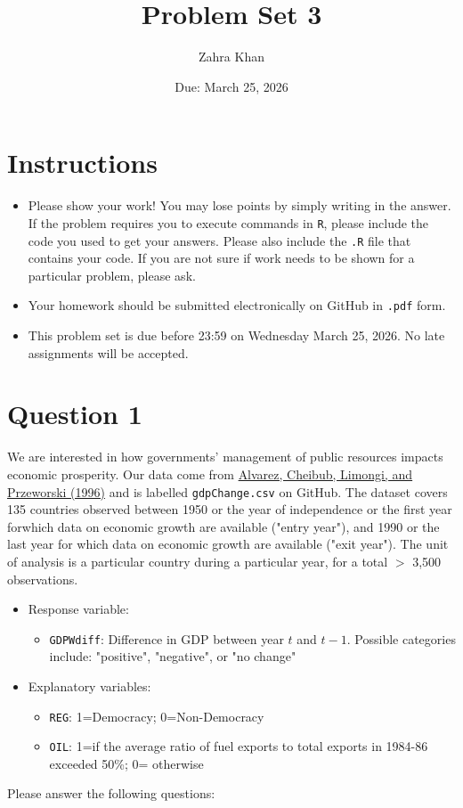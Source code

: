 \documentclass[12pt,letterpaper]{article}
\title{Problem Set 3}
\date{Due: March 25, 2026}
\author{Zahra Khan}
\begin{document}
	\maketitle
	\section*{Instructions}
	\begin{itemize}
	\item Please show your work! You may lose points by simply writing in the answer. If the problem requires you to execute commands in \texttt{R}, please include the code you used to get your answers. Please also include the \texttt{.R} file that contains your code. If you are not sure if work needs to be shown for a particular problem, please ask.
\item Your homework should be submitted electronically on GitHub in \texttt{.pdf} form.
\item This problem set is due before 23:59 on Wednesday March 25, 2026. No late assignments will be accepted.
	\end{itemize}

	\vspace{.25cm}
\section*{Question 1}
\vspace{.25cm}
\noindent We are interested in how governments' management of public resources impacts economic prosperity. Our data come from \href{https://www.researchgate.net/profile/Adam_Przeworski/publication/240357392_Classifying_Political_Regimes/links/0deec532194849aefa000000/Classifying-Political-Regimes.pdf}{Alvarez, Cheibub, Limongi, and Przeworski (1996)} and is labelled \texttt{gdpChange.csv} on GitHub. The dataset covers 135 countries observed between 1950 or the year of independence or the first year forwhich data on economic growth are available ("entry year"), and 1990 or the last year for which data on economic growth are available ("exit year"). The unit of analysis is a particular country during a particular year, for a total $>$ 3,500 observations. 

\begin{itemize}
	\item
	Response variable: 
	\begin{itemize}
		\item \texttt{GDPWdiff}: Difference in GDP between year $t$ and $t-1$. Possible categories include: "positive", "negative", or "no change"
	\end{itemize}
	\item
	Explanatory variables: 
	\begin{itemize}
		\item
		\texttt{REG}: 1=Democracy; 0=Non-Democracy
		\item
		\texttt{OIL}: 1=if the average ratio of fuel exports to total exports in 1984-86 exceeded 50\%; 0= otherwise
	\end{itemize}
	
\end{itemize}
\newpage
\noindent Please answer the following questions:
\end{document}
